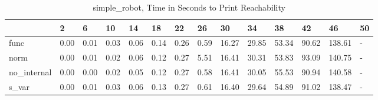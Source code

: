 \begin{table}
\caption{simple_robot, Time in Seconds to Print Reachability}
\label{simple_robot_states_time}
\begin{tabular}{llllllllllllll}
\toprule
 & 2 & 6 & 10 & 14 & 18 & 22 & 26 & 30 & 34 & 38 & 42 & 46 & 50 \\
\midrule
func & 0.00 & 0.01 & 0.03 & 0.06 & 0.14 & 0.26 & 0.59 & 16.27 & 29.85 & 53.34 & 90.62 & 138.61 & - \\
norm & 0.00 & 0.01 & 0.02 & 0.06 & 0.12 & 0.27 & 5.51 & 16.41 & 30.31 & 53.83 & 93.09 & 140.75 & - \\
no_internal & 0.00 & 0.00 & 0.02 & 0.05 & 0.12 & 0.27 & 0.58 & 16.41 & 30.05 & 55.53 & 90.94 & 140.58 & - \\
s_var & 0.00 & 0.01 & 0.03 & 0.06 & 0.13 & 0.27 & 0.61 & 16.40 & 29.64 & 54.89 & 91.02 & 138.47 & - \\
\bottomrule
\end{tabular}
\end{table}

